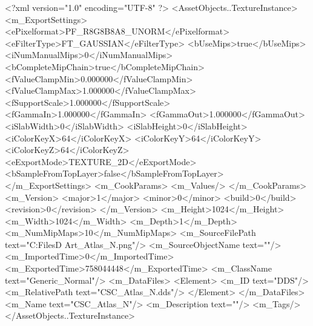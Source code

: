 <?xml version="1.0" encoding="UTF-8" ?>
<AssetObjects..TextureInstance>
	<m_ExportSettings>
		<ePixelformat>PF_R8G8B8A8_UNORM</ePixelformat>
		<eFilterType>FT_GAUSSIAN</eFilterType>
		<bUseMips>true</bUseMips>
		<iNumManualMips>0</iNumManualMips>
		<bCompleteMipChain>true</bCompleteMipChain>
		<fValueClampMin>0.000000</fValueClampMin>
		<fValueClampMax>1.000000</fValueClampMax>
		<fSupportScale>1.000000</fSupportScale>
		<fGammaIn>1.000000</fGammaIn>
		<fGammaOut>1.000000</fGammaOut>
		<iSlabWidth>0</iSlabWidth>
		<iSlabHeight>0</iSlabHeight>
		<iColorKeyX>64</iColorKeyX>
		<iColorKeyY>64</iColorKeyY>
		<iColorKeyZ>64</iColorKeyZ>
		<eExportMode>TEXTURE_2D</eExportMode>
		<bSampleFromTopLayer>false</bSampleFromTopLayer>
	</m_ExportSettings>
	<m_CookParams>
		<m_Values/>
	</m_CookParams>
	<m_Version>
		<major>1</major>
		<minor>0</minor>
		<build>0</build>
		<revision>0</revision>
	</m_Version>
	<m_Height>1024</m_Height>
	<m_Width>1024</m_Width>
	<m_Depth>1</m_Depth>
	<m_NumMipMaps>10</m_NumMipMaps>
	<m_SourceFilePath text="C:\Users\Shadow\Desktop\Working Files\3D Art\Textures\CSC_Atlas_N.png"/>
	<m_SourceObjectName text=""/>
	<m_ImportedTime>0</m_ImportedTime>
	<m_ExportedTime>758044448</m_ExportedTime>
	<m_ClassName text="Generic_Normal"/>
	<m_DataFiles>
		<Element>
			<m_ID text="DDS"/>
			<m_RelativePath text="CSC_Atlas_N.dds"/>
		</Element>
	</m_DataFiles>
	<m_Name text="CSC_Atlas_N"/>
	<m_Description text=""/>
	<m_Tags/>
</AssetObjects..TextureInstance>

